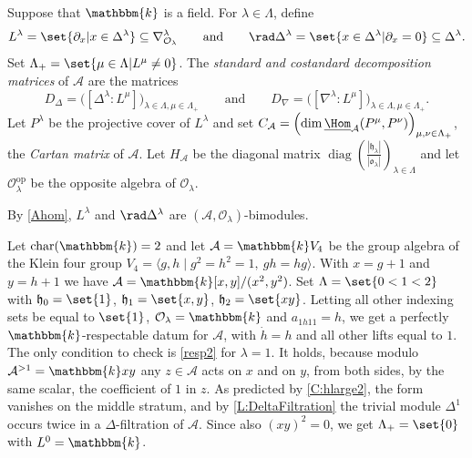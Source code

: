 \documentclass[a4paper,11pt]{amsart}
\newcommand{\uHom}{\underline{\Hom}}
\let\<\langle
\let\>\rangle
\numberwithin{equation}{subsection}
\theoremstyle{definition}
\theoremstyle{theorem}
\theoremstyle{remark}
\newcommand\CA{\mathcal{A}}
\newcommand\CO{\mathcal{O}}
\newcommand\hlam[1][\lambda]{\mathfrak{h}_{#1}}
\newcommand\Olam[1][\lambda]{\CO_{#1}}
\newcommand\olam[1][\lambda]{\mathfrak{o}_{#1}}
\newcommand\op{\operatorname}
\newcommand\kk{\mathbbm{k}}
\begin{document}
   \begin{Definition}\label{D:RespectableSimples}
     Suppose that $\kk$ is a field. For
     $\lambda\in\Lambda$, define
     \[
       L^\lambda=\set{\partial_x|x\in\Delta^\lambda}\subseteq\nabla^\lambda_{\Olam}
       \qquad\text{and}\qquad
       \rad\Delta^\lambda=\set{x\in\Delta^\lambda|\partial_x=0}\subseteq\Delta^\lambda.
     \]
     Set $\Lambda_+=\set{\mu\in\Lambda|L^\mu\ne0}$.
     The \emph{standard
     and costandard decomposition matrices} of $\CA$ are the matrices
     \[
         D_\Delta=\bigl([\Delta^\lambda:L^\mu]\bigr)_{\lambda\in\Lambda, \mu\in\Lambda_+}
         \qquad\text{and}\qquad
         D_\nabla=\bigl([\nabla^\lambda:L^\mu]\bigr)_{\lambda\in\Lambda, \mu\in\Lambda_+}.
     \]
     Let $P^\lambda$ be the projective cover of $L^\lambda$ and set
     $C_{\CA}=\Bigl(\dim\uHom_{\CA}(P^\mu,P^\nu)\Bigr)_{\mu,\nu\in\Lambda_+}$,
     the \emph{Cartan matrix} of $\CA$.
      Let
     $H_{\CA}$ be the diagonal matrix  $\op{diag}\left(\tfrac{|\hlam|}{|\olam|}\right)_{\lambda\in\Lambda}$
     and let $\Olam^{\mathrm{op}}$  be the opposite algebra of $\Olam$.
   \end{Definition}

   By \autoref{Ahom}, $L^\lambda$ and $\rad\Delta^\lambda$ are
   $(\CA,\Olam)$-bimodules.

\begin{Example}\label{Ex:KleinFour}
  Let $\op{char}(\kk)=2$ and let $\CA=\kk V_4$ be the group algebra of the Klein four
  group $V_4=\<g,h\mid g^2=h^2=1,\ gh=hg\>$. With $x=g+1$ and $y=h+1$ we have
  $\CA=\kk[x,y]/(x^2,y^2)$. Set $\Lambda=\set{0<1<2}$ with $\hlam[0]=\set{1}$,
  $\hlam[1]=\set{x,y}$, $\hlam[2]=\set{xy}$. Letting all other indexing sets be equal to
  $\set{1}$, $\Olam=\kk$ and $a_{1h11}=h$, we get a perfectly $\kk$-respectable datum for
  $\CA$, with $\dot h=h$ and all other lifts equal to $1$. The only condition to check
  is \autoref{resp2} for $\lambda=1$. It holds, because modulo $\CA^{>1}=\kk xy$ any
  $z\in\CA$ acts on $x$ and on $y$, from both sides, by the same scalar, the coefficient
  of $1$ in $z$. As predicted by \autoref{C:hlarge2}, the form vanishes on the middle stratum,
  and by \autoref{L:DeltaFiltration} the trivial module $\Delta^1$ occurs twice in a
  $\Delta$-filtration of $\CA$. Since also $(xy)^2=0$, we get $\Lambda_+=\set{0}$ with
  $L^0=\kk$.
\end{Example}
\end{document}

